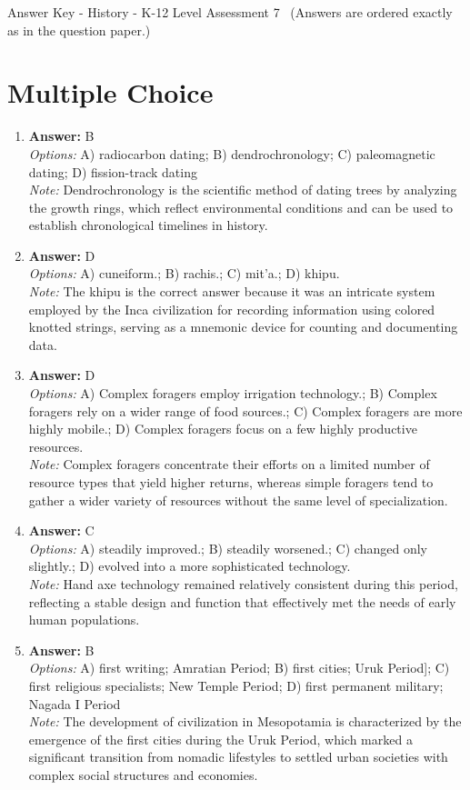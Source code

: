 \documentclass[12pt]{article}
\begin{document}
\begin{center}
Answer Key - History - K-12 Level Assessment 7 \
\small (Answers are ordered exactly as in the question paper.)
\end{center}

\section*{Multiple Choice}
\begin{enumerate}[label=\arabic*.]
\item \textbf{Answer:} B
\\ \textit{Options:} A) radiocarbon dating; B) dendrochronology; C) paleomagnetic dating; D) fission-track dating
\\ \textit{Note:} Dendrochronology is the scientific method of dating trees by analyzing the growth rings, which reflect environmental conditions and can be used to establish chronological timelines in history.
\item \textbf{Answer:} D
\\ \textit{Options:} A) cuneiform.; B) rachis.; C) mit'a.; D) khipu.
\\ \textit{Note:} The khipu is the correct answer because it was an intricate system employed by the Inca civilization for recording information using colored knotted strings, serving as a mnemonic device for counting and documenting data.
\item \textbf{Answer:} D
\\ \textit{Options:} A) Complex foragers employ irrigation technology.; B) Complex foragers rely on a wider range of food sources.; C) Complex foragers are more highly mobile.; D) Complex foragers focus on a few highly productive resources.
\\ \textit{Note:} Complex foragers concentrate their efforts on a limited number of resource types that yield higher returns, whereas simple foragers tend to gather a wider variety of resources without the same level of specialization.
\item \textbf{Answer:} C
\\ \textit{Options:} A) steadily improved.; B) steadily worsened.; C) changed only slightly.; D) evolved into a more sophisticated technology.
\\ \textit{Note:} Hand axe technology remained relatively consistent during this period, reflecting a stable design and function that effectively met the needs of early human populations.
\item \textbf{Answer:} B
\\ \textit{Options:} A) first writing; Amratian Period; B) first cities; Uruk Period]; C) first religious specialists; New Temple Period; D) first permanent military; Nagada I Period
\\ \textit{Note:} The development of civilization in Mesopotamia is characterized by the emergence of the first cities during the Uruk Period, which marked a significant transition from nomadic lifestyles to settled urban societies with complex social structures and economies.
\end{enumerate}
\end{document}
